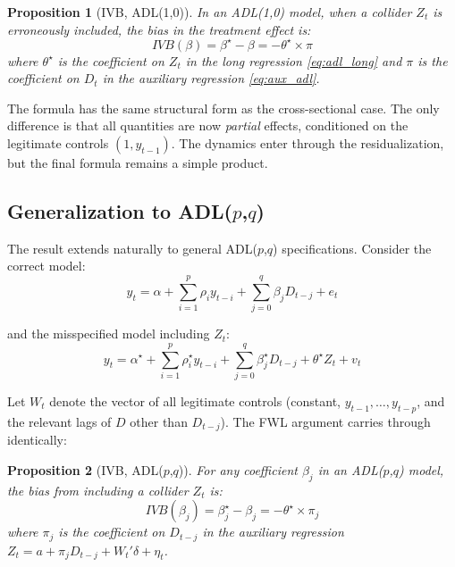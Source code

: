 \documentclass[
]{article}
\newtheorem{proposition}{Proposition}
\begin{document}
\begin{proposition}[IVB, ADL(1,0)]
\label{prop:ivb_adl}
In an ADL(1,0) model, when a collider $Z_t$ is erroneously included, the bias in the treatment effect is:
\begin{equation}
\boxed{\textit{IVB}(\beta) = \beta^{\star} - \beta = -\theta^{\star} \times \pi}
\label{eq:ivb_adl}
\end{equation}
where $\theta^{\star}$ is the coefficient on $Z_t$ in the long regression \eqref{eq:adl_long} and $\pi$ is the coefficient on $D_t$ in the auxiliary regression \eqref{eq:aux_adl}.
\end{proposition}

The formula has the same structural form as the cross-sectional case.
The only difference is that all quantities are now \emph{partial}
effects, conditioned on the legitimate controls \((1, y_{t-1})\). The
dynamics enter through the residualization, but the final formula
remains a simple product.

\subsection{\texorpdfstring{Generalization to ADL(\(p\),\(q\))
\label{sec:adl_pq}}{Generalization to ADL(p,q) }}\label{generalization-to-adlpq}

The result extends naturally to general ADL(\(p\),\(q\)) specifications.
Consider the correct model: \[
y_t = \alpha + \sum_{i=1}^{p} \rho_i y_{t-i} + \sum_{j=0}^{q} \beta_j D_{t-j} + e_t
\]

and the misspecified model including \(Z_t\): \[
y_t = \alpha^{\star} + \sum_{i=1}^{p} \rho_i^{\star} y_{t-i} + \sum_{j=0}^{q} \beta_j^{\star} D_{t-j} + \theta^{\star} Z_t + v_t
\]

Let \(W_t\) denote the vector of all legitimate controls (constant,
\(y_{t-1}, \ldots, y_{t-p}\), and the relevant lags of \(D\) other than
\(D_{t-j}\)). The FWL argument carries through identically:

\begin{proposition}[IVB, ADL($p$,$q$)]
\label{prop:ivb_adlpq}
For any coefficient $\beta_j$ in an ADL($p$,$q$) model, the bias from including a collider $Z_t$ is:
\begin{equation}
\boxed{\textit{IVB}(\beta_j) = \beta_j^{\star} - \beta_j = -\theta^{\star} \times \pi_j}
\label{eq:ivb_adlpq}
\end{equation}
where $\pi_j$ is the coefficient on $D_{t-j}$ in the auxiliary regression $Z_t = a + \pi_j D_{t-j} + W_t'\delta + \eta_t$.
\end{proposition}
\end{document}
